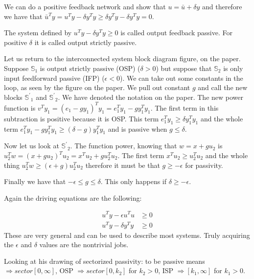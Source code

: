 \documentclass[11pt]{article}
\begin{document}
We can do a positive feedback network and show that $u = \bar{u} + \delta y$ and therefore we have that $\bar{u}^Ty = u^Ty - \delta y^Ty \geq \delta y^Ty - \delta y^Ty =0$.

The system defined by $u^Ty - \delta y^Ty \geq 0$ is called output feedback passive. For positive $\delta$ it is called output strictly passive.

Let us return to the interconnected system block diagram figure, on the paper. Suppose $\mathbb{S}_1$ is output strictly passive (OSP) ($\delta > 0$) but suppose that  $\mathbb{S}_2$ is only input feedforward passive (IFP) ($\epsilon < 0$). We can take out some constants in the loop, as seen by the figure on the paper. We pull out constant $g$ and call the new blocks $\mathbb{S^\prime}_1$ and $\mathbb{S^\prime}_2$. We have denoted the notation on the paper. The new power function is $v^Ty_1 = (e_1 - gy_1)^Ty_1 = e_1^Ty_1 - gy_1^Ty_1$. The first term in this subtraction is positive because it is OSP. This term $e_1^Ty_1 \geq \delta y_1^Ty_1$ and the whole term $e_1^Ty_1 - gy_1^Ty_1 \geq (\delta - g)y_1^Ty_1$ and is passive when $g \leq \delta$.

Now let us look at  $\mathbb{S^\prime}_2$. The function power, knowing that $w = x + gu_2$ is $u_2^Tw = (x + gu_2)^Tu_2 = x^Tu_2 + gu_2^Tu_2 $. The first term $x^Tu_2 \geq u_2^Tu_2$ and the whole thing $u_2^Tw \geq (\epsilon + g) u_2^Tu_2$ therefore it must be that $g \geq - \epsilon$ for passivity.

Finally we have that $-\epsilon \leq g \leq \delta$. This only happens if $\delta \geq - \epsilon$.

Again the driving equations are the following: 

\begin{align}
	u^Ty - \epsilon u^Tu & \geq 0 \\
	u^Ty - \delta y^Ty & \geq 0
\end{align}
These are very general and can be used to describe most systems. Truly acquiring the $\epsilon$ and $\delta$ values are the nontrivial jobs.

Looking at his drawing of sectorized passivity: to be passive means $\Rightarrow sector[0,\infty]$, OSP $\Rightarrow sector[0,k_2]$ for $k_2 > 0$, ISP $\Rightarrow[k_1,\infty]$ for $k_1>0$.




























\clearpage
% 
\end{document}

